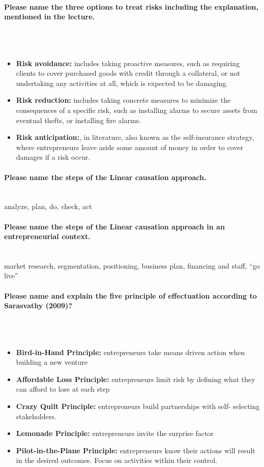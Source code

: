 \documentclass[10pt,a4paper,noendnumber=true]{scrartcl}
\newcommand{\properparagraph}[1]{\paragraph{\textcolor{Emerald}{#1}}\mbox{}\\}
\begin{document}
\properparagraph{Please name the three options to treat risks including the explanation, mentioned in the lecture.}
\\[-6ex]
\begin{itemize}
	\item \textbf{Risk avoidance:} includes taking proactive measures, such as requiring
	clients to cover purchased goods with credit through a collateral, or not
	undertaking any activities at all, which is expected to be damaging.
	\item \textbf{Risk reduction:} includes taking concrete measures to minimize the
	consequences of a specific risk, such as installing alarms to secure
	assets from eventual thefts, or installing fire alarms.
	\item \textbf{Risk anticipation:}, in literature, also known as the self-insurance strategy, where entrepreneurs leave aside some amount of money in order to
	cover damages if a risk occur.
\end{itemize}

\properparagraph{Please name the steps of the Linear causation approach.}
analyze, plan, do, check, act

\properparagraph{Please name the steps of the Linear causation approach in an entrepreneurial context.}
market research, segmentation, positioning, business plan, financing and staff, "`go live"'

\properparagraph{Please name and explain the five principle of effectuation according to Sarasvathy (2009)?}
\\[-6ex]
\begin{itemize}
	\item \textbf{Bird-in-Hand Principle:} entrepreneurs take means driven action when building a new venture
	\item \textbf{Affordable Loss Principle:} entrepreneurs limit risk by defining what they can afford to lose at each step
	\item \textbf{Crazy Quilt Principle:} entrepreneurs	build partnerships with self-
	selecting stakeholders.	
	\item \textbf{Lemonade Principle:} entrepreneurs invite the surprise factor
	\item \textbf{Pilot-in-the-Plane Principle:} entrepreneurs know their actions will result in the desired outcomes. Focus on activities within their control.	
\end{itemize}
\end{document}

